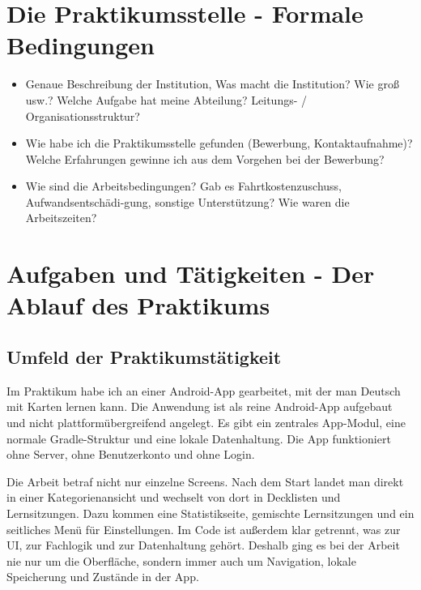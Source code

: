 \documentclass{Vorlage}
\begin{document}
\section{Die Praktikumsstelle - Formale Bedingungen}

\begin{itemize}

\item Genaue Beschreibung der Institution, Was macht die Institution? Wie gro\ss{} usw.? Welche Aufgabe hat meine Abteilung? Leitungs- / Organisationsstruktur?

\item Wie habe ich die Praktikumsstelle gefunden (Bewerbung, Kontaktaufnahme)? Welche Erfahrungen gewinne ich aus dem Vorgehen bei der Bewerbung?

\item Wie sind die Arbeitsbedingungen? Gab es Fahrtkostenzuschuss, Aufwandsentsch\"adi-gung, sonstige Unterst\"utzung? Wie waren die Arbeitszeiten?

\end{itemize}

\newpage

\section{Aufgaben und T\"atigkeiten - Der Ablauf des Praktikums}

\renewcommand{\thesection}{\arabic{section}}

\subsection{Umfeld der Praktikumst\"atigkeit}

Im Praktikum habe ich an einer Android-App gearbeitet, mit der man Deutsch mit Karten lernen kann. Die Anwendung ist als reine Android-App aufgebaut und nicht plattform\"ubergreifend angelegt. Es gibt ein zentrales App-Modul, eine normale Gradle-Struktur und eine lokale Datenhaltung. Die App funktioniert ohne Server, ohne Benutzerkonto und ohne Login.

Die Arbeit betraf nicht nur einzelne Screens. Nach dem Start landet man direkt in einer Kategorienansicht und wechselt von dort in Decklisten und Lernsitzungen. Dazu kommen eine Statistikseite, gemischte Lernsitzungen und ein seitliches Men\"u f\"ur Einstellungen. Im Code ist au\ss{}erdem klar getrennt, was zur UI, zur Fachlogik und zur Datenhaltung geh\"ort. Deshalb ging es bei der Arbeit nie nur um die Oberfl\"ache, sondern immer auch um Navigation, lokale Speicherung und Zust\"ande in der App.
\end{document}
